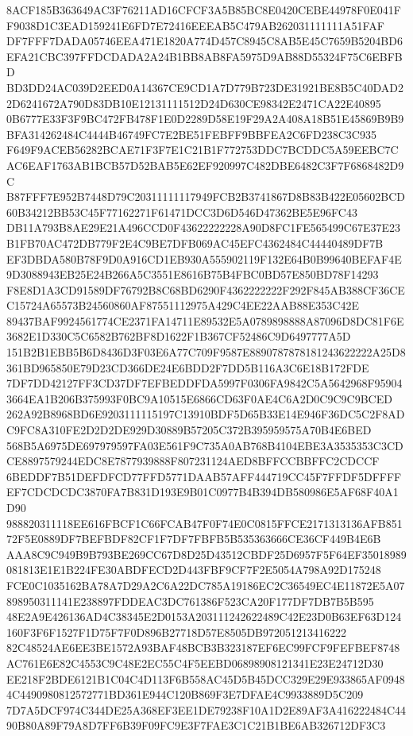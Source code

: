 \documentclass[UTF8,fontset=fandol,zihao=-4,a4paper]{ctexart}
\begin{document}
{{8ACF185B363649AC3F76211AD16CFCF3A5B85BC8E0420CEBE44978F0E041FF9038D1C3EAD159241E6FD7E72416EEEAB5C479AB262031111111A51FAF
DF7FFF7DADA05746EEA471E1820A774D457C8945C8AB5E45C7659B5204BD6EFA21CBC397FFDCDADA2A24B1BB8AB8FA5975D9AB88D55324F75C6EBFBD
BD3DD24AC039D2EED0A14367CE9CD1A7D779B723DE31921BE8B5C40DAD22D6241672A790D83DB10E12131111512D24D630CE98342E2471CA22E40895
0B6777E33F3F9BC472FB478F1E0D2289D58E19F29A2A408A18B51E45869B9B9BFA314262484C4444B46749FC7E2BE51FEBFF9BBFEA2C6FD238C3C935
F649F9ACEB56282BCAE71F3F7E1C21B1F772753DDC7BCDDC5A59EEBC7CAC6EAF1763AB1BCB57D52BAB5E62EF920997C482DBE6482C3F7F6868482D9C
B87FFF7E952B7448D79C20311111117949FCB2B3741867D8B83B422E05602BCD60B34212BB53C45F77162271F61471DCC3D6D546D47362BE5E96FC43
DB11A793B8AE29E21A496CCD0F43622222228A90D8FC1FE565499C67E37E23B1FB70AC472DB779F2E4C9BE7DFB069AC45EFC4362484C44440489DF7B
EF3DBDA580B78F9D0A916CD1EB930A555902119F132E64B0B99640BEFAF4E9D3088943EB25E24B266A5C3551E8616B75B4FBC0BD57E850BD78F14293
F8E8D1A3CD91589DF76792B8C68BD6290F4362222222F292F845AB388CF36CEC15724A65573B24560860AF87551112975A429C4EE22AAB88E353C42E
89437BAF9924561774CE2371FA14711E89532E5A0789898888A87096D8DC81F6E3682E1D330C5C6582B762BF8D1622F1B367CF52486C9D6497777A5D
151B2B1EBB5B6D8436D3F03E6A77C709F9587E8890787878181243622222A25D8361BD965850E79D23CD366DE24E6BDD2F7DD5B116A3C6E18B172FDE
7DF7DD42127FF3CD37DF7EFBEDDFDA5997F0306FA9842C5A5642968F959043664EA1B206B375993F0BC9A10515E6866CD63F0AE4C6A2D0C9C9C9BCED
262A92B8968BD6E9203111115197C13910BDF5D65B33E14E946F36DC5C2F8ADC9FC8A310FE2D2D2DE929D30889B57205C372B395959575A70B4E6BED
568B5A6975DE697979597FA03E561F9C735A0AB768B4104EBE3A3535353C3CDCE8897579244EDC8E7877939888F807231124AED8BFFCCBBFFC2CDCCF
6BEDDF7B51DEFDFCD77FFD5771DAAB57AFF444719CC45F7FFDF5DFFFFEF7CDCDCDC3870FA7B831D193E9B01C0977B4B394DB580986E5AF68F40A1D90
988820311118EE616FBCF1C66FCAB47F0F74E0C0815FFCE2171313136AFB85172F5E0889DF7BEFBDF82CF1F7DF7FBFB5B535363666CE36CF449B4E6B
AAA8C9C949B9B793BE269CC67D8D25D43512CBDF25D6957F5F64EF35018989081813E1E1B224FE30ABDFECD2D443FBF9CF7F2E5054A798A92D175248
FCE0C1035162BA78A7D29A2C6A22DC785A19186EC2C36549EC4E11872E5A07898950311141E238897FDDEAC3DC761386F523CA20F177DF7DB7B5B595
48E2A9E426136AD4C38345E2D0153A203111242622489C42E23D0B63EF63D124160F3F6F1527F1D75F7F0D896B27718D57E8505DB972051213416222
82C48524AE6EE3BE1572A93BAF48BCB3B323187EF6EC99FCF9FEFBEF8748AC761E6E82C4553C9C48E2EC55C4F5EEBD06898908121341E23E24712D30
EE218F2BDE6121B1C04C4D113F6B558AC45D5B45DCC329E29E933865AF09484C4490980812572771BD361E944C120B869F3E7DFAE4C9933889D5C209
7D7A5DCF974C344DE25A368EF3EE1DE79238F10A1D2E89AF3A416222484C4490B80A89F79A8D7FF6B39F09FC9E3F7FAE3C1C21B1BE6AB326712DF3C3
}}
\end{document}
